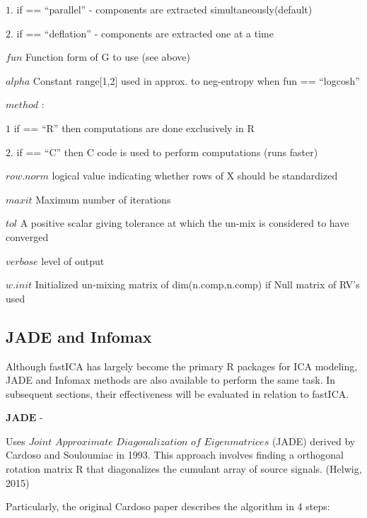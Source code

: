 \documentclass[12pt,twoside]{amherstthesis}
\begin{document}
  \(1.\) if == ``parallel'' - components are extracted
  simultaneously(default)
  
  \(2.\) if == ``deflation'' - components are extracted one at a time
  \newline
  
  \(fun\) Function form of G to use (see above)
  
  \(alpha\) Constant range{[}1,2{]} used in approx. to neg-entropy when
  fun == ``logcosh''
  
  \(method\) : \newline
  
  \(1\) if == ``R'' then computations are done exclusively in R
  
  \(2.\) if == ``C'' then C code is used to perform computations (runs
  faster) \newline
  
  \(row.norm\) logical value indicating whether rows of X should be
  standardized
  
  \(maxit\) Maximum number of iterations
  
  \(tol\) A positive scalar giving tolerance at which the un-mix is
  considered to have converged
  
  \(verbose\) level of output
  
  \(w.init\) Initialized un-mixing matrix of dim(n.comp,n.comp) if Null
  matrix of RV's used
  
  \subsection{JADE and Infomax}\label{jade-and-infomax}
  
  Although fastICA has largely become the primary R packages for ICA
  modeling, JADE and Infomax methods are also available to perform the
  same task. In subsequent sections, their effectiveness will be evaluated
  in relation to fastICA. \newline
  
  \(\textbf{JADE}\) -
  
  Uses \(\textit{Joint Approximate Diagonalization of Eigenmatrices}\)
  (JADE) derived by Cardoso and Souloumiac in 1993. This approach involves
  finding a orthogonal rotation matrix R that diagonalizes the cumulant
  array of source signals. (Helwig, 2015) \newline
  
  Particularly, the original Cardoso paper describes the algorithm in 4
  steps: \newline
  
\end{document}
